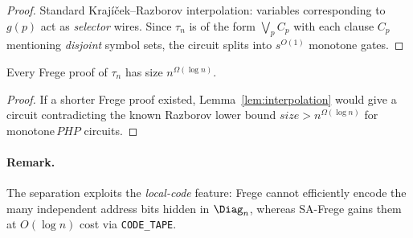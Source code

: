 \begin{proof}
Standard Krajíček–Razborov interpolation:
variables corresponding to
$g(p)$ act as \emph{selector} wires.
Since $\tau_n$ is of the form
$\bigvee_p C_p$ with each clause $C_p$
mentioning \emph{disjoint} symbol sets,
the circuit splits into $s^{O(1)}$ monotone gates.
\end{proof}

\begin{theorem}\label{thm:frege-lb}
Every Frege proof of $\tau_n$ has size
$n^{\Omega(\log n)}$.
\end{theorem}

\begin{proof}
If a shorter Frege proof existed,
Lemma~\ref{lem:interpolation} would give
a circuit contradicting the known
Razborov \cite{Raz87} lower bound
$\textit{size}\!>\!n^{\Omega(\log n)}$
for monotone $\textit{PHP}$ circuits.
\end{proof}

\paragraph{Remark.}
The separation exploits the \emph{local-code} feature:
Frege cannot efficiently encode the many
independent address bits hidden in $\Diag_n$,
whereas SA-Frege gains them at $O(\log n)$ cost
via \texttt{CODE\_TAPE}.
